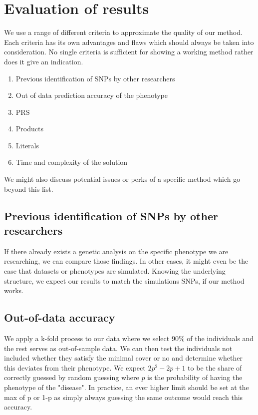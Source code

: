 \documentclass[letterpaper, 11pt]{article}
\begin{document}
\section{Evaluation of results}
\label{sec:evaluate}
We use a range of different criteria to approximate the quality of our method. Each criteria has its own advantages and flaws which should always be taken into consideration. No single criteria is sufficient for showing a working method rather does it give an indication.

\begin{enumerate}
\item Previous identification of SNPs by other researchers
\item Out of data prediction accuracy of the phenotype
\item PRS 
\item Products 
\item Literals
\item Time and complexity of the solution\end{enumerate}

We might also discuss potential issues or perks of a specific method which go beyond this list. 

\subsection{Previous identification of SNPs by other researchers}
If there already exists a genetic analysis on the specific phenotype we are researching, we can compare those findings. 
In other cases, it might even be the case that datasets or phenotypes are simulated. Knowing the underlying structure, we expect our results to match the simulations SNPs, if our method works. 
\subsection{Out-of-data accuracy}
We apply  a k-fold process to our data where we select 90\% of the individuals and the rest serves as out-of-sample data. We can then test the individuals not included whether they satisfy the minimal cover or no and determine whether this deviates from their phenotype.  We expect $2p^2-2p+1$ to be the share of correctly guessed by random guessing where $p$ is the probability of having the phenotype of the "disease". In practice, an ever higher limit should be set at  the max of p  or 1-p as simply always guessing the same outcome would reach this accuracy. 
\end{document}
